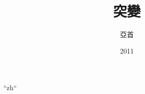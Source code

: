 \usepackage{makeidx}
\makeindex

\usepackage{ifpdf}
\ifpdf
\usepackage{thumbpdf}
\else
\fi

\usepackage{fontspec}
\usepackage{xunicode}
\usepackage{xltxtra}
\XeTeXlinebreaklocale “zh“


\usepackage{fancyhdr}
\pagestyle{fancy}
\fancyhf{}
\fancyhead[LE,RO]{\thepage}
\fancyhead[RE]{\leftmark}
\fancyhead[LO]{\rightmark}
\renewcommand\chaptermark[1]{\markright{\chaptername~ #1}{}}

\usepackage{titlesec}
\titleformat{\chapter}{\huge}{\chaptername}{1em}{\textbf}


\usepackage[CJKaddspaces,CJKchecksingle,CJKnumber]{xeCJK}
\xeCJKnobreakbetweenpuncts
{}



\title{突變}
\author{亞首}
\date{2011}

\renewcommand{\contentsname}{目錄}
\renewcommand{\chaptername}{第\CJKnumber{\thechapter}章}
\renewcommand{\figurename}{圖}
\renewcommand{\tablename}{表}
\renewcommand{\bibname}{參考及引用出處}
\renewcommand{\appendixname}{附錄}
\renewcommand{\indexname}{索引}

